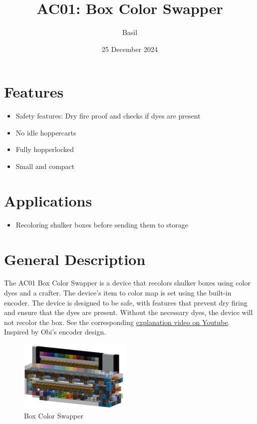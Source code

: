 \documentclass[10pt]{datasheet}
\title{AC01: Box Color Swapper}
\author{Basil}
\date{25 December 2024}
\begin{document}
\maketitle

\section{Features}

\begin{itemize}
\item{Safety features: Dry fire proof and checks if dyes are present}
\item{No idle hoppercarts}
\item{Fully hopperlocked}
\item{Small and compact}
\end{itemize}

\section{Applications}

\begin{itemize}
\item{Recoloring shulker boxes before sending them to storage}
\end{itemize}

\section{General Description}
The AC01 Box Color Swapper is a device that recolors shulker boxes using color dyes and a crafter. The device's item to color map is set using the built-in encoder. The device is designed to be safe, with features that prevent dry firing and ensure that the dyes are present. Without the necessary dyes, the device will not recolor the box. See the corresponding  \href{https://www.youtube.com/watch?v=nnvas8g5LmQ}{explanation video on Youtube}. Inspired by Obi's encoder design.
\vfill\break

\begin{figure}[H]
    \centering
    \includegraphics[width=0.48\textwidth]{area_render_30_.png}
    \caption{\centering Box Color Swapper}
\end{figure}
\end{document}
